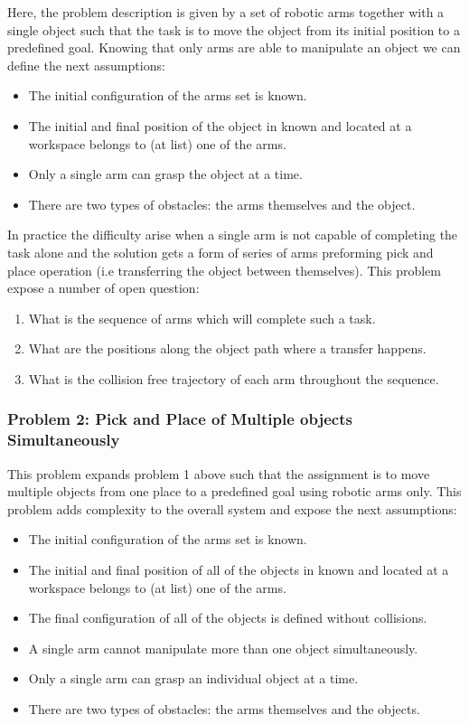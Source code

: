 Here, the problem description is given by a set of robotic arms together with a single object such that the task is to move the object from its initial position to a predefined goal. Knowing that only arms are able to manipulate an object we can define the next assumptions:
\begin{itemize}
\item The initial configuration of the arms set is known.
\item The initial and final position of the object in known and located at a workspace belongs to (at list) one of the arms.
\item Only a single arm can grasp the object at a time. 
\item There are two types of obstacles: the arms themselves and the object.
\end{itemize}
In practice the difficulty arise when a single arm is not capable of completing the task alone and the solution gets a form of series of arms preforming pick and place operation (i.e transferring the object between themselves). This problem expose a number of open question:
\begin{enumerate}
\item What is the sequence of arms which will complete such a task.
\item What are the positions along the object path where a transfer happens.
\item What is the collision free trajectory of each arm throughout the sequence.
\end{enumerate}


\subsubsection*{Problem 2: Pick and Place of Multiple objects Simultaneously }
This problem expands problem 1 above such that the assignment is to move multiple objects from one place to a predefined goal using robotic arms only. This problem adds complexity to the overall system and expose the next assumptions:
\begin{itemize}
\item The initial configuration of the arms set is known.
\item The initial and final position of all of the objects in known and located at a workspace belongs to (at list) one of the arms.
\item The final configuration of all of the objects is defined without collisions.
\item A single arm cannot manipulate more than one object simultaneously.
\item Only a single arm can grasp an individual object at a time. 
\item There are two types of obstacles: the arms themselves and the objects.
\end{itemize}


